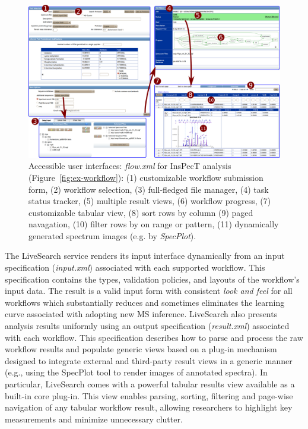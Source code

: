 \documentclass[arial,11pt]{article}
\newcommand{\SF}[1]{\textsf{#1}}
\newcommand{\SYSTEM}[0]{\SF{ProteoSAFe}\xspace}
\newcommand{\LiveSearch}[0]{\SF{LiveSearch}\xspace}
\begin{document}
\begin{figure}[ht]
  \includegraphics[width=\textwidth]{figures/access.pdf}
  \caption{\footnotesize Accessible user interfaces:
{\em  flow.xml} for InsPecT analysis (Figure~\ref{fig:ex-workflow}):
   (1) customizable workflow submission form,
   (2) workflow selection,
   (3) full-fledged file manager,
   (4) task status tracker,
   (5) multiple result views,
   (6) workflow progress,
   (7) customizable tabular view,
   (8) sort rows by column
   (9) paged navagation,
   (10) filter rows by on range or pattern,
   (11) dynamically generated spectrum images (e.g. by {\em  SpecPlot}).
}
  \label{fig:acc}
\end{figure}
The \LiveSearch service renders its input interface dynamically from an input specification ({\em  input.xml}) associated with each supported workflow.
This specification contains the types, validation policies, and layouts of the workflow's input data. The result is a valid input form with consistent {\em  look and feel} for all workflows which substantially reduces and sometimes eliminates the learning curve associated with adopting new MS  inference.
\LiveSearch also presents analysis results uniformly using an output specification ({\em  result.xml}) associated with each workflow.
This specification describes how to parse and process the raw workflow results and populate generic views
based on a plug-in mechanism designed to integrate external and third-party result views in a generic manner (e.g., using the SpecPlot tool to render images of annotated spectra).
In particular, \LiveSearch comes with a powerful tabular results view available as a built-in core plug-in. This view enables parsing, sorting, filtering and page-wise navigation of any tabular workflow result, allowing researchers to highlight key measurements and minimize unnecessary clutter.
\end{document}
